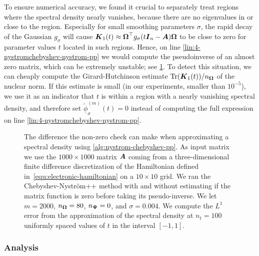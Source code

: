 To ensure numerical accuracy, we found it crucial to separately treat regions
where the spectral density nearly vanishes, because there are no eigenvalues in or close to the region.
Especially for small smoothing parameters $\sigma$, the rapid decay of the Gaussian $g_{\sigma}$ will cause $\boldsymbol{K}_1(t) \approx \boldsymbol{\Omega}^{\top} g_{\sigma}(t\boldsymbol{I}_n - \boldsymbol{A}) \boldsymbol{\Omega}$ to be close to zero for parameter values $t$ located in such regions. Hence, on line \ref{lin:4-nystromchebyshev-nystrom-pp} we would compute the pseudoinverse of an almost zero matrix, which can be extremely unstable; see \cref{fig:zerocheck}. To detect this situation, we can cheaply compute the Girard-Hutchinson 
estimate $\operatorname{Tr}(\boldsymbol{K}_1(t)) / n_{\boldsymbol{\Omega}}$ of the nuclear norm. If this estimate is small (in our experiments, smaller than $10^{-5}$), we use it as an indicator that $t$ is within a region with a nearly vanishing spectral density, and therefore set $\widetilde{\underline{\phi}}_{\sigma}^{(m)}(t) = 0$ instead of computing the full expression on line \ref{lin:4-nystromchebyshev-nystrom-pp}.

\begin{figure}[ht]
    \centering
    \scalebox{0.8}{}
    \caption{The difference the non-zero check can make when approximating a spectral density using \cref{alg:nystrom-chebyshev-pp}. As input matrix we use the $1000 \times 1000$ matrix $\boldsymbol{A}$ coming from a three-dimensional finite difference discretization of the Hamiltonian defined in~\cref{equ:electronic-hamiltonian} on a $10 \times 10$ grid. We ran the Chebyshev-Nyström++ method with and without estimating if the matrix function is zero before taking its pseudo-inverse. We let $m=2000$, $n_{\boldsymbol{\Omega}}=80$, $n_{\boldsymbol{\Psi}}=0$, and $\sigma = 0.004$. We compute the $L^1$ error from the approximation of the spectral density at $n_t = 100$ uniformly spaced values of $t$ in the interval $[-1, 1]$.}
    \label{fig:zerocheck}
\end{figure}

\color{black}

\subsubsection{Analysis}
\label{subsubsec:chebyshev-nystrom-analysis}

